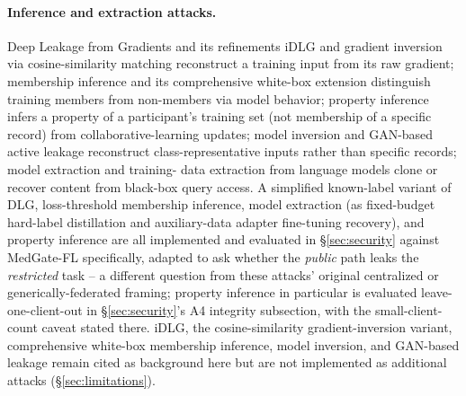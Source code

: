 \documentclass[11pt]{article}
\begin{document}
\paragraph{Inference and extraction attacks.} Deep Leakage from Gradients
\citep{zhu2019deep} and its refinements iDLG \citep{zhao2020idlg} and
gradient inversion via cosine-similarity matching
\citep{geiping2020inverting} reconstruct a training input from its raw
gradient; membership inference \citep{shokri2017membership} and its
comprehensive white-box extension \citep{nasr2019comprehensive}
distinguish training members from non-members via model behavior; property
inference \citep{melis2019exploiting} infers a property of a
participant's training set (not membership of a specific record) from
collaborative-learning updates; model inversion
\citep{fredrikson2015model} and GAN-based active leakage
\citep{hitaj2017deep} reconstruct class-representative inputs rather than
specific records; model extraction \citep{tramer2016stealing} and training-
data extraction from language models \citep{carlini2021extracting} clone or
recover content from black-box query access. A simplified known-label
variant of DLG, loss-threshold membership inference, model extraction (as
fixed-budget hard-label distillation and auxiliary-data adapter fine-tuning
recovery), and property inference \citep{melis2019exploiting} are all
implemented and evaluated in \S\ref{sec:security} against MedGate-FL
specifically, adapted to ask whether the \emph{public} path leaks the
\emph{restricted} task -- a different question from these attacks' original
centralized or generically-federated framing; property inference in
particular is evaluated leave-one-client-out in \S\ref{sec:security}'s A4
integrity subsection, with the small-client-count caveat stated there. iDLG,
the cosine-similarity gradient-inversion variant, comprehensive white-box
membership inference, model inversion, and GAN-based leakage remain cited as
background here but are not implemented as additional attacks
(\S\ref{sec:limitations}).
\end{document}
